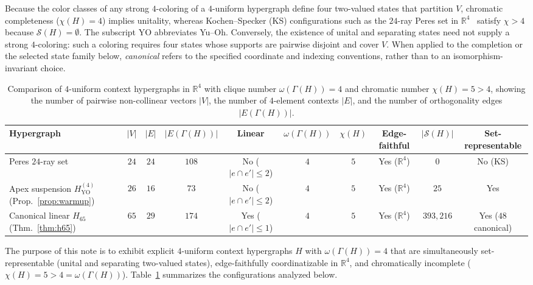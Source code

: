 \documentclass[
  aps,
  pra,
  reprint,
  superscriptaddress,
  amsmath,
  amssymb,
  nofootinbib,
  floatfix
]{revtex4-2}
\theoremstyle{definition}
\theoremstyle{remark}
\newcommand{\R}{\mathbb{R}}
\newcommand{\YO}{\mathrm{YO}}
\begin{document}
Because the color classes of any strong $4$-coloring of a $4$-uniform hypergraph define four two-valued states that partition $V$, chromatic completeness ($\chi(H)=4$) implies unitality, whereas Kochen--Specker (KS) configurations such as the $24$-ray Peres set in $\R^4$~\cite{peres-91} satisfy $\chi>4$ because $\mathcal{S}(H)=\emptyset$. The subscript $\YO$ abbreviates Yu--Oh. Conversely, the existence of unital and separating states need not supply a strong $4$-coloring: such a coloring requires four states whose supports are pairwise disjoint and cover $V$. When applied to the completion or the selected state family below, \emph{canonical} refers to the specified coordinate and indexing conventions, rather than to an isomorphism-invariant choice.

\begin{table}[t]
\caption{Comparison of $4$-uniform context hypergraphs in $\R^4$ with clique number $\omega(\Gamma(H))=4$ and chromatic number $\chi(H)=5>4$, showing the number of pairwise non-collinear vectors $|V|$, the number of $4$-element contexts $|E|$, and the number of orthogonality edges $|E(\Gamma(H))|$.}\label{tab:comparison}
\begin{ruledtabular}
\scriptsize
\begin{tabular}{lccccccccc}
Hypergraph & $|V|$ & $|E|$ & $|E(\Gamma(H))|$ & Linear & $\omega(\Gamma(H))$ & $\chi(H)$ & Edge-faithful & $|\mathcal{S}(H)|$ & Set-representable \\ \hline
Peres $24$-ray set~\cite{peres-91} & $24$ & $24$ & $108$ & No ($|e\cap e'|\le2$) & $4$ & $5$ & Yes ($\R^4$) & $0$ & No (KS) \\
Apex suspension $H_{\YO}^{(4)}$ (Prop.~\ref{prop:warmup}) & $26$ & $16$ & $73$ & No ($|e\cap e'|\le2$) & $4$ & $5$ & Yes ($\R^4$) & $25$ & Yes \\
Canonical linear $H_{65}$ (Thm.~\ref{thm:h65}) & $65$ & $29$ & $174$ & Yes ($|e\cap e'|\le1$) & $4$ & $5$ & Yes ($\R^4$) & $393{,}216$ & Yes ($48$ canonical)
\end{tabular}
\end{ruledtabular}
\end{table}

The purpose of this note is to exhibit explicit $4$-uniform context hypergraphs $H$ with $\omega(\Gamma(H))=4$ that are simultaneously set-representable (unital and separating two-valued states), edge-faithfully coordinatizable in $\R^4$, and chromatically incomplete ($\chi(H)=5>4=\omega(\Gamma(H))$). Table~\ref{tab:comparison} summarizes the configurations analyzed below.
\end{document}
